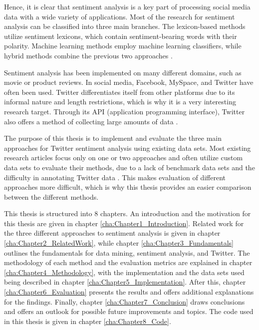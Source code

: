 Hence, it is clear that sentiment analysis is a key part of processing social media data with a wide variety of applications. Most of the research for sentiment analysis can be classified into three main branches. The lexicon-based methods utilize sentiment lexicons, which contain sentiment-bearing words with their polarity. Machine learning methods employ machine learning classifiers, while hybrid methods combine the previous two approaches \cite{MEDHAT20141093}.

Sentiment analysis has been implemented on many different domains, such as movie or product reviews. In social media, Facebook, MySpace, and Twitter have often been used. Twitter differentiates itself from other platforms due to its informal nature and length restrictions, which is why it is a very interesting research target. Through its API (application programming interface), Twitter also offers a method of collecting large amounts of data \cite{DBLP:journals/csur/GiachanouC16}.

The purpose of this thesis is to implement and evaluate the three main approaches for Twitter sentiment analysis using existing data sets. Most existing research articles focus only on one or two approaches and often utilize custom data sets to evaluate their methods, due to a lack of benchmark data sets and the difficulty in annotating Twitter data \cite{DBLP:journals/csur/GiachanouC16}. This makes evaluation of different approaches more difficult, which is why this thesis provides an easier comparison between the different methods.

This thesis is structured into 8 chapters. An introduction and the motivation for this thesis are given in chapter \ref{cha:Chapter1_Introduction}. Related work for the three different approaches to sentiment analysis is given in chapter \ref{cha:Chapter2_RelatedWork}, while chapter \ref{cha:Chapter3_Fundamentals} outlines the fundamentals for data mining, sentiment analysis, and Twitter. The methodology of each method and the evaluation metrics are explained in chapter \ref{cha:Chapter4_Methodology}, with the implementation and the data sets used being described in chapter \ref{cha:Chapter5_Implementation}. After this, chapter \ref{cha:Chapter6_Evaluation} presents the results and offers additional explanations for the findings. Finally, chapter \ref{cha:Chapter7_Conclusion} draws conclusions and offers an outlook for possible future improvements and topics. The code used in this thesis is given in chapter \ref{cha:Chapter8_Code}.




